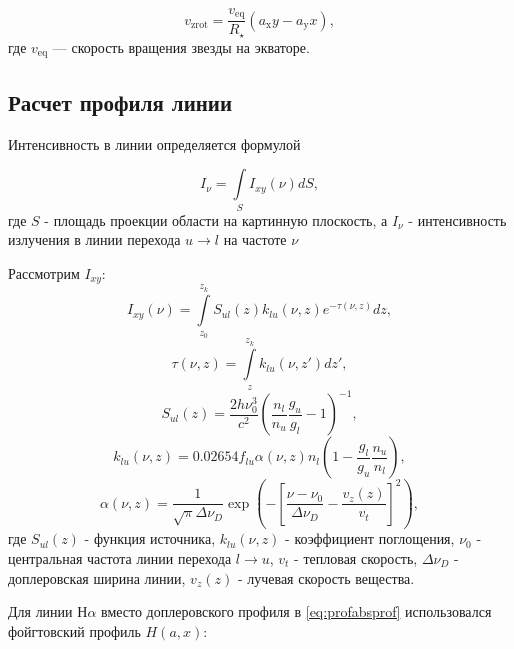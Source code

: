 \documentclass{article}
\begin{document}
\begin{equation} \label{eq:vzrot}
v_\text{zrot} = \frac{v_\text{eq}}{R_\star}(a_\text{x}y - a_\text{y}x),
\end{equation}
где $v_\text{eq}$ --- скорость вращения звезды на экваторе.

\subsection{Расчет профиля линии}


Интенсивность в линии определяется формулой

\begin{equation} \label{eq:profmain}
I_{\nu} = \int \limits_{S} I_{xy}(\nu) dS,
\end{equation}
где $S$ - площадь проекции области на картинную плоскость, а $I_\nu$ - интенсивность излучения в линии перехода $u \rightarrow l$ на частоте $\nu$ 

Рассмотрим $I_{xy}$:
\begin{equation} \label{eq:profproj}
I_{xy}(\nu) = \int \limits_{z_0}^{z_k} S_{ul}(z)k_{lu}(\nu,z)e^{-\tau(\nu,z)}dz,
\end{equation}
\begin{equation} \label{eq:profdepth}
\tau(\nu,z) = \int \limits_z^{z_k} k_{lu}(\nu,z')dz',
\end{equation}
\begin{equation} \label{eq:profsource}
S_{ul}(z) = \frac{2h\nu_0^3}{c^2}\left(\frac{n_l}{n_u} \frac{g_u}{g_l} - 1 \right)^{-1},
\end{equation}
\begin{equation} \label{eq:profabsorb}
k_{lu}(\nu,z) = 0.02654f_{lu}\alpha(\nu, z)n_l\left(1 - \frac{g_l}{g_u}\frac{n_u}{n_l}\right),
\end{equation}
\begin{equation} \label{eq:profabsprof}
\alpha(\nu, z) = \frac{1}{\sqrt{\pi} \Delta\nu_D} \exp\left( -\left[ \frac{\nu - \nu_0}{\Delta\nu_D} - \frac{v_z(z)}{v_t}\right]^2\right),
\end{equation}
где $S_{ul}(z)$ - функция источника, $k_{lu}(\nu, z)$ - коэффициент поглощения, $\nu_0$ - центральная частота линии перехода $l \rightarrow u$, $v_t$ - тепловая скорость, $\Delta\nu_D$ - доплеровская ширина линии, $v_z(z)$ - лучевая скорость вещества.

Для линии Н$\alpha$ вместо доплеровского профиля в \eqref{eq:profabsprof} использовался фойгтовский профиль $H(a, x)$:
\end{document}
